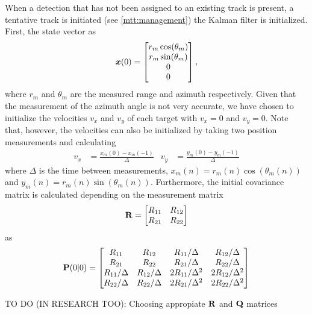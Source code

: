 When a detection that has not been assigned to an existing track is present, a tentative track is initiated (see \cref{mtt:management}) the Kalman filter is initialized. First, the state vector as
\begin{equation}
	\vec{x}(0) = \begin{bmatrix}
	r_m\cos(\theta_m) \\ r_m\sin(\theta_m) \\0 \\0
	\end{bmatrix}\\,
\end{equation}
where $r_m$ and $\theta_m$ are the measured range and azimuth respectively. Given that the measurement of the azimuth angle is not very accurate, we have chosen to initialize the velocities $v_x$ and $v_y$ of each target with $v_x = 0$ and $v_y=0$. Note that, however, the velocities can also be initialized by taking two position measurements and calculating
\begin{align}
	v_x &= \frac{x_m(0)-x_m(-1)}{\Delta}  & v_y &= \frac{y_m(0)-y_m(-1)}{\Delta}
\end{align}
where $\Delta$ is the time between measurements, $x_m(n)  = r_m(n)\cos(\theta_m(n))$ and $y_m(n)  = r_m(n)\sin(\theta_m(n))$. Furthermore, the initial covariance matrix is calculated depending on the measurement matrix 
\begin{equation}
	\matrix{R} = \begin{bmatrix}
	R_{11} & R_{12}\\ R_{21} & R_{22}
	\end{bmatrix}
\end{equation}
as
\begin{equation}
	\matrix{P}(0|0) = \begin{bmatrix}
	R_{11} & R_{12} & R_{11}/\Delta & R_{12}/\Delta \\
	R_{21} & R_{22} & R_{21}/\Delta & R_{22}/\Delta \\
	R_{11}/\Delta & R_{12}/\Delta & 2R_{11}/\Delta^2 & 2R_{12}/\Delta^2 \\
		R_{22}/\Delta & R_{22}/\Delta & 2R_{21}/\Delta^2 & 2R_{22}/\Delta^2 
 	\end{bmatrix}
\end{equation}

TO DO (IN RESEARCH TOO):  Choosing appropiate $\matrix{R}$ and $\matrix{Q}$ matrices